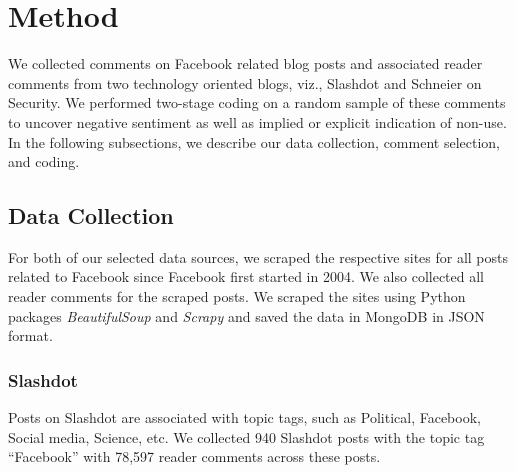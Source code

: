 \section{Method}
\label{sec:method}
We collected comments on Facebook related blog posts and associated reader comments from two technology oriented blogs, viz., Slashdot and Schneier on Security. We performed two-stage coding on a random sample of these comments to uncover negative sentiment as well as implied or explicit indication of non-use. In the following subsections, we describe our data collection, comment selection, and coding.
\subsection{Data Collection}
For both of our selected data sources, we scraped the respective sites for all posts related to Facebook since Facebook first started in 2004. We also collected all reader comments for the scraped posts. We scraped the sites using Python packages \textit{BeautifulSoup} and \textit{Scrapy} and saved the data in MongoDB in JSON format.

\subsubsection{Slashdot}
Posts on Slashdot are associated with topic tags, such as Political, Facebook, Social media, Science, etc. We collected 940 Slashdot posts with the topic tag ``Facebook'' with 78,597 reader comments across these posts.

